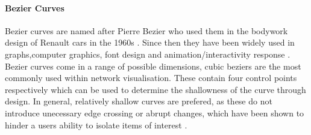 \paragraph*{Bezier Curves}
Bezier curves are named after Pierre Bezier who used them in the bodywork design of Renault cars in the 1960s \citep{beziermath}. Since then they have been widely used in graphs,computer graphics, font design and animation/interactivity response \citep{bezier,beziermath,beziercomputer}. Bezier curves come in a range of possible dimensions, cubic beziers are the most commonly used within network visualisation. These contain four control points respectively which can be used to determine the shallowness of the curve through design. In general, relatively shallow curves are prefered, as these do not introduce unecessary edge crossing or abrupt changes, which have been shown to hinder a users ability to isolate items of interest \citep{ch6graphredability}.


